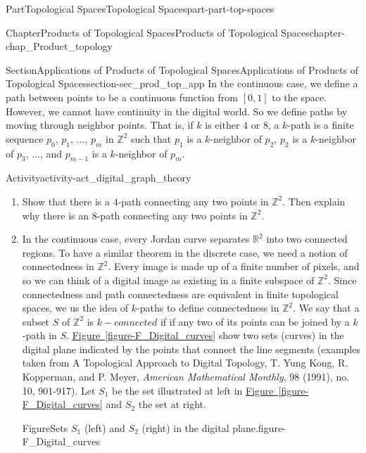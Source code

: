 \documentclass[oneside,10pt,]{book}
\newcommand{\xreffont}{\relax}
\newcommand{\pubtitle}[1]{\textsl{#1}}
\numberwithin{equation}{chapter}
\newcommand{\Z}{\mathbb{Z}}
\newcommand{\R}{\mathbb{R}}
\begin{document}
\begin{partptx}{Part}{Topological Spaces}{}{Topological Spaces}{}{}{part-part-top-spaces}
\begin{chapterptx}{Chapter}{Products of Topological Spaces}{}{Products of Topological Spaces}{}{}{chapter-chap_Product_topology}
\begin{sectionptx}{Section}{Applications of Products of Topological Spaces}{}{Applications of Products of Topological Spaces}{}{}{section-sec_prod_top_app}
In the continuous case, we define a path between points to be a continuous function from \([0,1]\) to the space. However, we cannot have continuity in the digital world. So we define paths by moving through neighbor points. That is, if \(k\) is either \(4\) or \(8\), a \(k\)-path is a finite sequence \(p_0\), \(p_1\), \(\ldots\), \(p_m\) in \(\Z^2\) such that \(p_1\) is a \(k\)-neighbor of \(p_2\), \(p_2\) is a \(k\)-neighbor of \(p_3\), \(\ldots\), and \(p_{m-1}\) is a \(k\)-neighbor of \(p_m\).%
\begin{activity}{Activity}{}{activity-act_digital_graph_theory}%
\begin{enumerate}[font=\bfseries,label=(\alph*),ref=\alph*]%
\item{}Show that there is a \(4\)-path connecting any two points in \(\Z^2\). Then explain why there is an \(8\)-path connecting any two points in \(\Z^2\).%
\item{}In the continuous case, every Jordan curve separates \(\R^2\) into two connected regions. To have a similar theorem in the discrete case, we need a notion of connectedness in \(\Z^2\). Every image is made up of a finite number of pixels, and so we can think of a digital image as existing in a finite subspace of \(\Z^2\). Since connectedness and path connectedness are equivalent in finite topological spaces, we us the idea of \(k\)-paths to define connectedness in \(\Z^2\). We say that a subset \(S\) of \(\Z^2\) is \(k-connected\) if if any two of its points can be joined by a \(k\)-path in \(S\). \hyperref[figure-F_Digital_curves]{Figure~{\xreffont\ref{figure-F_Digital_curves}}} show two sets (curves) in the digital plane indicated by the points that connect the line segments (examples taken from A Topological Approach to Digital Topology, T. Yung Kong, R. Kopperman, and P. Meyer, \pubtitle{American Mathematical Monthly}, 98 (1991), no. 10, 901-917). Let \(S_1\) be the set illustrated at left in \hyperref[figure-F_Digital_curves]{Figure~{\xreffont\ref{figure-F_Digital_curves}}} and \(S_2\) the set at right.%
\begin{figureptx}{Figure}{Sets \(S_1\) (left) and \(S_2\) (right) in the digital plane.}{figure-F_Digital_curves}{}%
\begin{sidebyside}{2}{0.025}{0.025}{0.05}%
\begin{sbspanel}{0.45}%

\end{sbspanel}
\end{sidebyside}
\end{figureptx}
\end{enumerate}
\end{activity}
\end{sectionptx}
\end{chapterptx}
\end{partptx}
\end{document}
